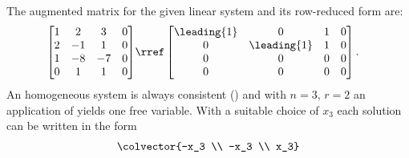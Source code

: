 The augmented matrix for the given linear system and its row-reduced form are:
\begin{align*}
\begin{bmatrix}
1 & 2 & 3 & 0\\
2 & -1 & 1 & 0\\
1 & -8 & -7 & 0\\
0 & 1 & 1 & 0
\end{bmatrix}
&\rref
\begin{bmatrix}
\leading{1} & 0 & 1 & 0\\
0 & \leading{1} & 1 & 0\\
0 & 0 & 0 & 0\\
0 & 0 & 0 & 0
\end{bmatrix}.
\end{align*}
An homogeneous system is always consistent () and with $n=3$, $r=2$ an application of  yields one free variable. With a suitable choice of $x_3$ each solution can be written in the form
%
\begin{align*}
\colvector{-x_3 \\ -x_3 \\ x_3}
\end{align*}
%
